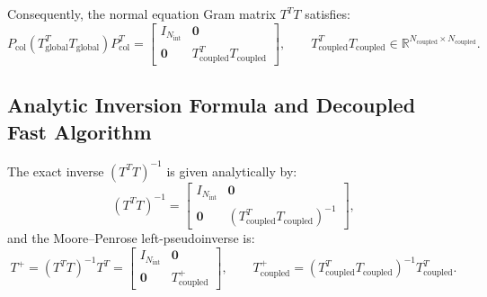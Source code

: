 \documentclass[11pt,a4paper]{article}
\newcommand{\R}{\mathbb{R}}
\newcommand{\mb}[1]{\mathbf{#1}}
\begin{document}
Consequently, the normal equation Gram matrix $T^T T$ satisfies:
\begin{equation} \label{eq:TtT_block_diagonal}
    P_{\text{col}} (T_{\text{global}}^T T_{\text{global}}) P_{\text{col}}^T = \begin{bmatrix}
        I_{N_{\text{int}}} & \mb{0} \\
        \mb{0} & T_{\text{coupled}}^T T_{\text{coupled}}
    \end{bmatrix}, \qquad T_{\text{coupled}}^T T_{\text{coupled}} \in \R^{N_{\text{coupled}} \times N_{\text{coupled}}}.
\end{equation}

\subsection{Analytic Inversion Formula and Decoupled Fast Algorithm}
The exact inverse $(T^T T)^{-1}$ is given analytically by:
\begin{equation}
    (T^T T)^{-1} = \begin{bmatrix}
        I_{N_{\text{int}}} & \mb{0} \\
        \mb{0} & (T_{\text{coupled}}^T T_{\text{coupled}})^{-1}
    \end{bmatrix},
\end{equation}
and the Moore--Penrose left-pseudoinverse is:
\begin{equation}
    T^+ = (T^T T)^{-1} T^T = \begin{bmatrix}
        I_{N_{\text{int}}} & \mb{0} \\
        \mb{0} & T_{\text{coupled}}^+
    \end{bmatrix}, \qquad T_{\text{coupled}}^+ = (T_{\text{coupled}}^T T_{\text{coupled}})^{-1} T_{\text{coupled}}^T.
\end{equation}
\end{document}
